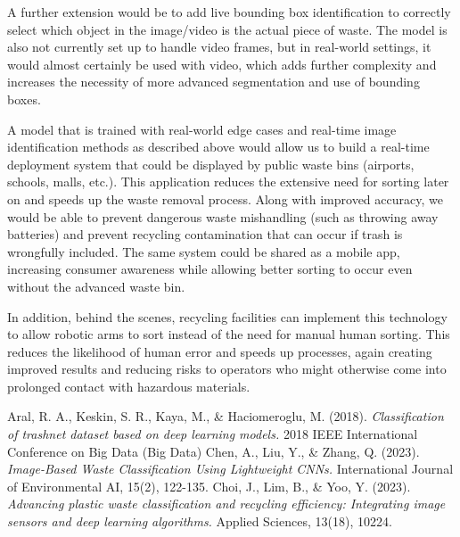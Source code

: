 \documentclass[11pt,twocolumn]{article}
\begin{document}
A further extension would be to add live bounding box identification to correctly select which object in the image/video is the actual piece of waste. The model is also not currently set up to handle video frames, but in real-world settings, it would almost certainly be used with video, which adds further complexity and increases the necessity of more advanced segmentation and use of bounding boxes.
\vspace{0.1cm}

A model that is trained with real-world edge cases and real-time image identification methods as described above would allow us to build a real-time deployment system that could be displayed by public waste bins (airports, schools, malls, etc.). This application reduces the extensive need for sorting later on and speeds up the waste removal process. Along with improved accuracy, we would be able to prevent dangerous waste mishandling (such as throwing away batteries) and prevent recycling contamination that can occur if trash is wrongfully included. The same system could be shared as a mobile app, increasing consumer awareness while allowing better sorting to occur even without the advanced waste bin. 
\vspace{0.2cm}

In addition, behind the scenes, recycling facilities can implement this technology to allow robotic arms to sort instead of the need for manual human sorting. This reduces the likelihood of human error and speeds up processes, again creating improved results and reducing risks to operators who might otherwise come into prolonged contact with hazardous materials.
\vspace{0.2cm}




%
\begin{thebibliography}{99}
Aral, R. A., Keskin, S. R., Kaya, M., \& Haciomeroglu, M. (2018).
\textit{Classification of trashnet dataset based on deep learning models.}
2018 IEEE International Conference on Big Data (Big Data)
Chen, A., Liu, Y., \& Zhang, Q. (2023).
\textit{Image-Based Waste Classification Using Lightweight CNNs.}
International Journal of Environmental AI, 15(2), 122-135.
Choi, J., Lim, B., \& Yoo, Y. (2023). 
\textit{Advancing plastic waste classification and recycling efficiency: Integrating image sensors and deep learning algorithms.}
Applied Sciences, 13(18), 10224.
\end{thebibliography}


\end{document}
